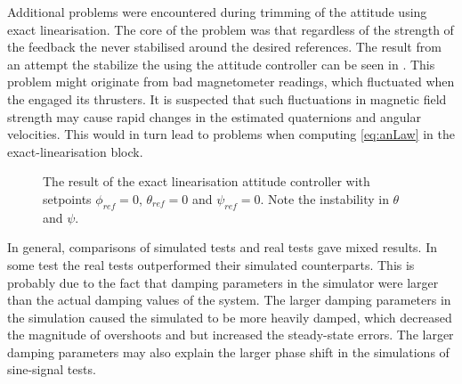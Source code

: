 Additional problems were encountered during trimming of the attitude \abbrPID using exact linearisation. The core of the problem was that regardless of the strength of the feedback the \abbrROV never stabilised around the desired references. The result from an attempt the stabilize the \abbrROV using the attitude controller can be seen in . This problem might originate from bad magnetometer readings, which fluctuated when the \abbrROV engaged its thrusters. It is suspected that such fluctuations in magnetic field strength may cause rapid changes in the estimated quaternions and angular velocities. This would in turn lead to problems when computing \eqref{eq:anLaw} in the exact-linearisation block. %

\begin{figure}
\centering
  \qquad
  \qquad
  \caption{\label{fig:ExactLinAttitude}%
  The result of the exact linearisation attitude controller with setpoints $\phi_{ref}=0$, $\theta_{ref}=0$ and $\psi_{ref}=0$. Note the instability in $\theta$ and $\psi$.}
\end{figure}

In general, comparisons of simulated tests and real tests gave mixed results.
In some test the real tests outperformed their simulated counterparts. This is probably due to the fact that damping parameters in the simulator were larger than the actual damping values of the system. The larger damping parameters in the simulation caused the simulated \abbrROV to be more heavily damped, which decreased the magnitude of overshoots and but increased the steady-state errors. The larger damping parameters may also explain the larger phase shift in the simulations of sine-signal tests.  

